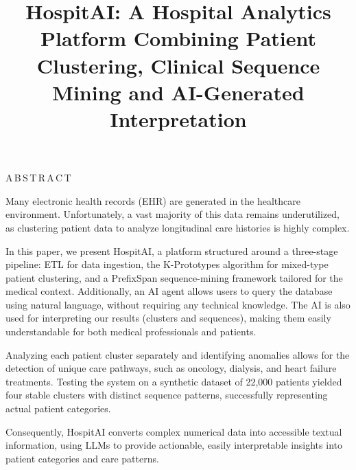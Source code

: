 \documentclass[conference]{IEEEtran}
\begin{document}
\title{HospitAI: A Hospital Analytics Platform Combining Patient Clustering, Clinical Sequence Mining and AI-Generated Interpretation}

\author{
\and
{}
}

\maketitle
\thispagestyle{plain}
\pagestyle{plain}

{\centering\normalsize A\,B\,S\,T\,R\,A\,C\,T\par}
\vspace{4pt}

{\small\noindent Many electronic health records (EHR) are generated in the healthcare environment. Unfortunately, a vast majority of this data remains underutilized, as clustering patient data to analyze longitudinal care histories is highly complex.

In this paper, we present HospitAI, a platform structured around a three-stage pipeline: ETL for data ingestion, the K-Prototypes algorithm for mixed-type patient clustering, and a PrefixSpan sequence-mining framework tailored for the medical context. Additionally, an AI agent allows users to query the database using natural language, without requiring any technical knowledge. The AI is also used for interpreting our results (clusters and sequences), making them easily understandable for both medical professionals and patients.

Analyzing each patient cluster separately and identifying anomalies allows for the detection of unique care pathways, such as oncology, dialysis, and heart failure treatments. Testing the system on a synthetic dataset of 22,000 patients yielded four stable clusters with distinct sequence patterns, successfully representing actual patient categories.

Consequently, HospitAI converts complex numerical data into accessible textual information, using LLMs to provide actionable, easily interpretable insights into patient categories and care patterns.\par}
\vspace{6pt}










\end{document}
